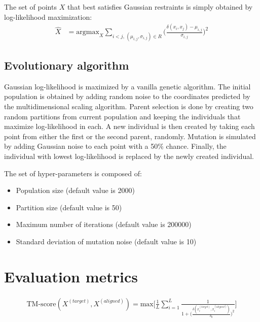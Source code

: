         The set of points $X$ that best satisfies Gaussian restraints is simply
        obtained by log-likelihood maximization:
        \begin{align}
            \hat{X} & = \text{argmax}_{X} \sum\limits_{i < j ,\, (\mu_{i,j}, \sigma_{i,j}) \in R}
                \Bigg(\frac{\delta(x_i, x_j) - \mu_{i,j}}{\sigma_{i,j}}\Bigg)^2
        \end{align}

    \subsection{Evolutionary algorithm}

        Gaussian log-likelihood is maximized by a vanilla genetic algorithm.
        The initial population is obtained by adding random noise to the coordinates
        predicted by the multidimensional scaling algorithm.
        Parent selection is done by creating two random partitions from current population
        and keeping the individuals that maximize log-likelihood in each.
        A new individual is then created by taking each point from either the first
        or the second parent, randomly. Mutation is simulated by adding Gaussian noise
        to each point with a 50\% chance.
        Finally, the individual with lowest log-likelihood is replaced by the
        newly created individual.

        The set of hyper-parameters is composed of:
        \begin{itemize}
            \item Population size (default value is 2000)
            \item Partition size (default value is 50)
            \item Maximum number of iterations (default value is 200000)
            \item Standard deviation of mutation noise (default value is 10)
        \end{itemize}

\section{Evaluation metrics}

\begin{align}
    \text{TM-score}(X^{(target)}, X^{(aligned)}) = \text{max} \Bigg[ \frac{1}{L} \sum\limits_{i=1}^L 
        \frac{1}{1 + \Big(\frac{\delta(x_i^{(target)}, x_i^{(aligned)})}{\delta_0}\Big)^2} \Bigg]
\end{align}

